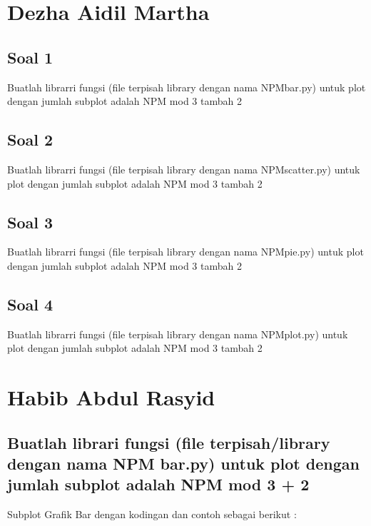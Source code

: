 \section{Dezha Aidil Martha}
\subsection{Soal 1}
Buatlah librarri fungsi (file terpisah library dengan nama NPMbar.py) untuk plot dengan jumlah subplot adalah NPM mod 3 tambah 2



\subsection{Soal 2}
Buatlah librarri fungsi (file terpisah library dengan nama NPMscatter.py) untuk plot dengan jumlah subplot adalah NPM mod 3 tambah  2



\subsection{Soal 3}
Buatlah librarri fungsi (file terpisah library dengan nama NPMpie.py) untuk plot dengan jumlah subplot adalah NPM mod 3 tambah 2



\subsection{Soal 4}
Buatlah librarri fungsi (file terpisah library dengan nama NPMplot.py) untuk plot dengan jumlah subplot adalah NPM mod 3 tambah  2



\section{Habib Abdul Rasyid}
\subsection{Buatlah librari fungsi (ﬁle terpisah/library dengan nama NPM bar.py) untuk plot dengan jumlah subplot adalah NPM mod 3 + 2}
Subplot Grafik Bar dengan kodingan dan contoh sebagai berikut :

